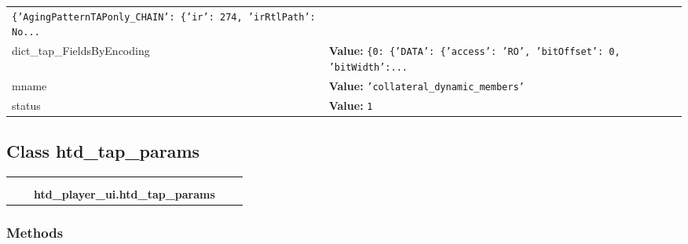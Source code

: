 \begin{longtable}{|p{\varnamewidth}|p{\vardescrwidth}|l}
{\tt \texttt{\{}\texttt{'}\texttt{AgingPatternTAPonly\_CHAIN}\texttt{'}\texttt{: }\texttt{\{}\texttt{'}\texttt{ir}\texttt{'}\texttt{: }274\texttt{, }\texttt{'}\texttt{irRtlPath}\texttt{'}\texttt{: }No\texttt{...}}&\\
\cline{1-2}
\raggedright d\-i\-c\-t\-\_\-t\-a\-p\-\_\-F\-i\-e\-l\-d\-s\-B\-y\-E\-n\-c\-o\-d\-i\-n\-g\- & \raggedright \textbf{Value:} 
{\tt \texttt{\{}0\texttt{: }\texttt{\{}\texttt{'}\texttt{DATA}\texttt{'}\texttt{: }\texttt{\{}\texttt{'}\texttt{access}\texttt{'}\texttt{: }\texttt{'}\texttt{RO}\texttt{'}\texttt{, }\texttt{'}\texttt{bitOffset}\texttt{'}\texttt{: }0\texttt{, }\texttt{'}\texttt{bitWidth}\texttt{'}\texttt{:}\texttt{...}}&\\
\cline{1-2}
\raggedright m\-n\-a\-m\-e\- & \raggedright \textbf{Value:} 
{\tt \texttt{'}\texttt{collateral\_dynamic\_members}\texttt{'}}&\\
\cline{1-2}
\raggedright s\-t\-a\-t\-u\-s\- & \raggedright \textbf{Value:} 
{\tt 1}&\\
\cline{1-2}
\end{longtable}



\subsection{Class htd\_tap\_params}

    \label{htd_player_ui:htd_tap_params}
\begin{tabular}{cccccc}
\multicolumn{2}{r}{\settowidth{\BCL}{object}\multirow{2}{\BCL}{object}}
&&
  \\\cline{3-3}
  &&\multicolumn{1}{c|}{}
&&
  \\
&&\multicolumn{2}{l}{\textbf{htd\_player\_ui.htd\_tap\_params}}
\end{tabular}



  \subsubsection{Methods}

